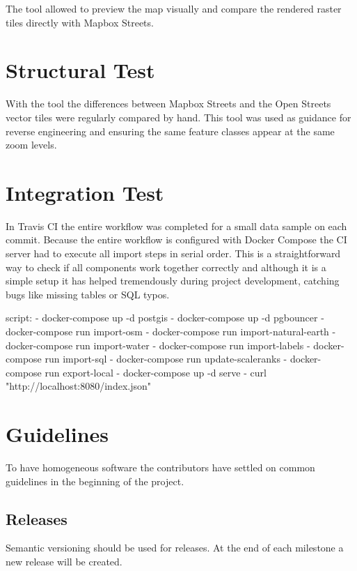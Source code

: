 The  tool allowed to preview the map visually and compare the rendered raster tiles directly with Mapbox Streets.

\section{Structural Test}

With the  tool the differences between Mapbox Streets and the Open Streets vector tiles were regularly compared by hand. This tool was used as guidance for reverse engineering and ensuring the same feature classes appear at the same zoom levels.

\section{Integration Test}

In Travis CI\cite{pm_5_travis-ci.org_2015}  the entire workflow was completed for a small data sample on each commit.
Because the entire workflow is configured with Docker Compose \cite{pm_6_docs.docker.com_2015} the CI server had to execute all import steps in serial order. This is a straightforward way to check if all components work together correctly
and although it is a simple setup it has helped tremendously during project development, catching bugs
like missing tables or SQL typos.

\begin{yamlcode}
script:
  - docker-compose up -d postgis
  - docker-compose up -d pgbouncer
  - docker-compose run import-osm
  - docker-compose run import-natural-earth
  - docker-compose run import-water
  - docker-compose run import-labels
  - docker-compose run import-sql
  - docker-compose run update-scaleranks
  - docker-compose run export-local
  - docker-compose up -d serve
  - curl "http://localhost:8080/index.json"
\end{yamlcode}



\section{Guidelines}\label{guidelines}
To have homogeneous software the contributors have settled on common guidelines in the beginning of the project.

\subsection{Releases}
Semantic versioning \cite{pm_7_preston-werner_2015} should be used for releases.
At the end of each milestone a new release will be created.

